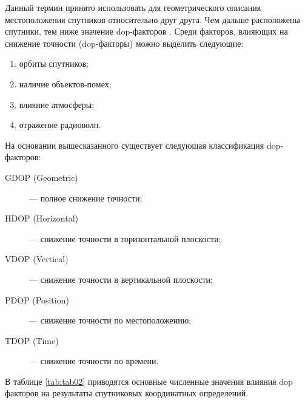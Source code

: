 Данный термин принято использовать для геометрического описания местоположения спутников относительно друг друга. Чем дальше расположены спутники, тем ниже значение dop-факторов \cite{src56, src58, src63}. Среди факторов, влияющих на снижение точности (dop-факторы) можно выделить следующие:
\begin{enumerate}
	\item орбиты спутников;
	\item наличие объектов-помех;
	\item влияние атмосферы;
	\item отражение радиоволн.
\end{enumerate} 

\vspace{5mm}

На основании вышесказанного существует следующая классификация dop-факторов:

\begin{description}
	\item [GDOP (Geometric)] --- полное снижение точности;
	\item [HDOP (Horizontal)] --- снижение точности в горизонтальной плоскости;
	\item [VDOP (Vertical)] --- снижение точности в вертикальной плоскости;
	\item [PDOP (Position)] --- снижение точности по местоположению;
	\item [TDOP (Time)] --- снижение точности по времени.
\end{description}

\vspace{5mm}

В таблице \cref{tab:tab02} приводятся основные численные значения влияния dop факторов на результаты спутниковых координатных определений.




